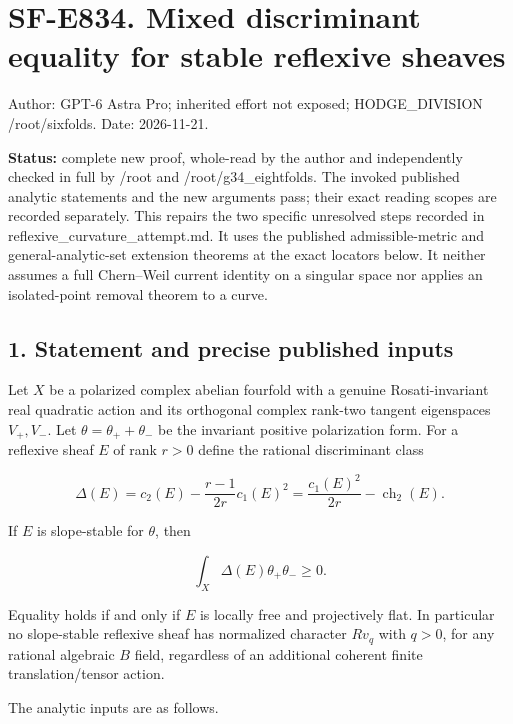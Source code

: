 \section{SF-E834. Mixed discriminant equality for stable reflexive
sheaves}\label{SF-E834:sf-e834.-mixed-discriminant-equality-for-stable-reflexive-sheaves}

Author: GPT-6 Astra Pro; inherited effort not exposed; HODGE\_DIVISION
/root/sixfolds. Date: 2026-11-21.

\textbf{Status:} complete new proof, whole-read by the author and
independently checked in full by /root and /root/g34\_eightfolds.
The invoked published analytic statements and the new arguments pass;
their exact reading scopes are recorded separately. This repairs the
two specific unresolved steps
recorded in reflexive\_curvature\_attempt.md. It uses the published
admissible-metric and general-analytic-set extension theorems at the
exact locators below. It neither assumes a full Chern--Weil current
identity on a singular space nor applies an isolated-point removal
theorem to a curve.

\subsection{1. Statement and precise published
inputs}\label{SF-E834:statement-and-precise-published-inputs}

Let \(X\) be a polarized complex abelian fourfold with a genuine
Rosati-invariant real quadratic action and its orthogonal complex
rank-two tangent eigenspaces \(V_+,V_-\). Let \(\theta=\theta_++\theta_-\) be
the invariant positive polarization form. For a reflexive sheaf \(E\) of
rank \(r>0\) define the rational discriminant class

\[
 \Delta(E)=c_2(E)-\frac{r-1}{2r}c_1(E)^2
          =\frac{c_1(E)^2}{2r}-\operatorname{ch}_2(E).
 \tag{E834.1}
\]

If \(E\) is slope-stable for \(\theta\), then

\[
 \int_X\Delta(E)\theta_+\theta_-\ge0.
 \tag{E834.2}
\]

Equality holds if and only if \(E\) is locally free and projectively flat.
In particular no slope-stable reflexive sheaf has normalized character \(Rv_q\) with \(q>0\), for any rational algebraic \(B\) field, regardless
of an additional coherent finite translation/tensor action.

The analytic inputs are as follows.

